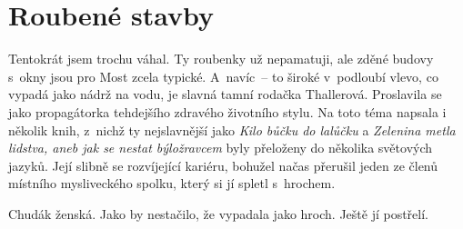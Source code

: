 
\chapter{Roubené stavby}

Tentokrát jsem trochu váhal. Ty roubenky už nepamatuji, ale zděné budovy s~okny
jsou pro Most zcela typické. A~navíc~-- to široké v~podloubí vlevo, co vypadá
jako nádrž na vodu, je slavná tamní rodačka Thallerová. Proslavila se jako
propagátorka tehdejšího zdravého životního stylu. Na toto téma napsala i
několik knih, z~nichž ty nejslavnější jako {\em Kilo bůčku do lalůčku} a {\em
Zelenina metla lidstva, aneb jak se nestat býložravcem} byly přeloženy do
několika světových jazyků. Její slibně se rozvíjející kariéru, bohužel načas
přerušil jeden ze členů místního mysliveckého spolku, který si jí spletl
s~hrochem.

Chudák ženská. Jako by nestačilo, že vypadala jako hroch. Ještě jí
postřelí.
